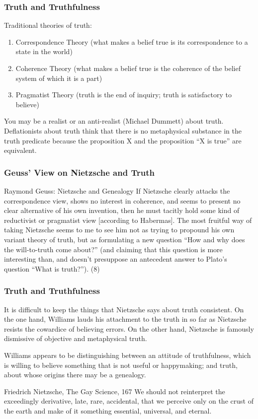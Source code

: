 \documentclass[xcolor=dvipsnames]{beamer}
\begin{document}
\begin{frame}
  \frametitle{Truth and Truthfulness}
  Traditional theories of truth:
  \begin{enumerate}
  \item Correspondence Theory (what makes a belief true is its
    correspondence to a state in the world)
  \item Coherence Theory (what makes a belief true is the coherence of
    the belief system of which it is a part)
  \item Pragmatist Theory (truth is the end of inquiry; truth is
    satisfactory to believe)
  \end{enumerate}
  You may be a realist or an anti-realist (Michael Dummett) about
  truth. Deflationists about truth think that there is no metaphysical
  substance in the truth predicate because the proposition X and the
  proposition ``X is true'' are equivalent.
\end{frame}

\begin{frame}
  \frametitle{Geuss' View on Nietzsche and Truth}
  \begin{block}{Raymond Geuss: Nietzsche and Genealogy}
    If Nietzsche clearly attacks the correspondence view, shows no
    interest in coherence, and seems to present no clear alternative
    of his own invention, then he must tacitly hold some kind of
    reductivist or pragmatist view [according to Habermas]. The most
    fruitful way of taking Nietzsche seems to me to see him not as
    trying to propound his own variant theory of truth, but as
    formulating a new question ``How and why does the will-to-truth
    come about?'' (and claiming that this question is more interesting
    than, and doesn't presuppose an antecedent answer to Plato's
    question ``What is truth?''). (8)
  \end{block}
\end{frame}

\begin{frame}
  \frametitle{Truth and Truthfulness}
  It is difficult to keep the things that Nietzsche says about truth
  consistent. On the one hand, Williams lauds his attachment to the
  truth in so far as Nietzsche resists the cowardice of believing
  errors. On the other hand, Nietzsche is famously dismissive of
  objective and metaphysical truth.

  \bigskip

  Williams appears to be distinguishing between an attitude of
  \alert{truthfulness}, which is willing to believe something that is
  not useful or happymaking; and \alert{truth}, about whose origins
  there may be a genealogy.
  \begin{block}{Friedrich Nietzsche, The Gay Science, 167}
    We should not reinterpret the exceedingly derivative, late, rare,
    accidental, that we perceive only on the crust of the earth and
    make of it something essential, universal, and eternal. 
  \end{block}
\end{frame}
\end{document}
